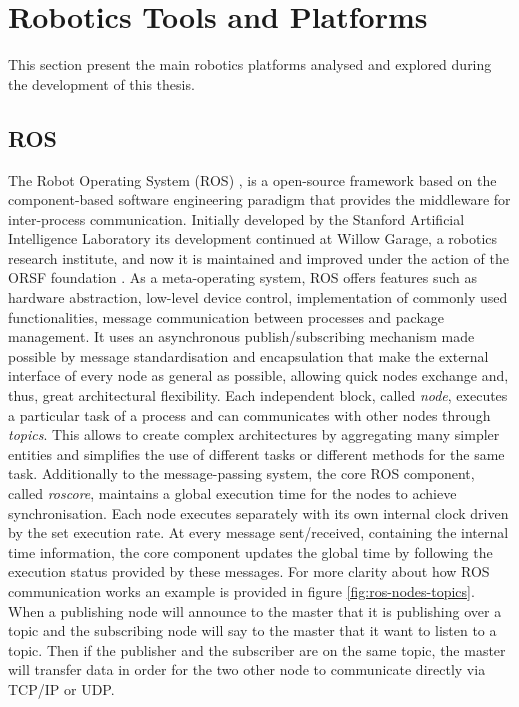 \section{Robotics Tools and Platforms} \label{sec:Robotics-Tools-and-Platforms}
This section present the main robotics platforms analysed and explored during the development of this thesis.

\subsection{ROS}
The Robot Operating System (ROS) \cite{ROS}, is a open-source framework based on the component-based software engineering paradigm that provides the middleware for inter-process communication. Initially developed by the Stanford  Artificial Intelligence Laboratory its development continued at Willow Garage, a robotics research institute, and now it is maintained and improved under the action of the ORSF foundation \cite{ROS}. As a meta-operating system, ROS offers features such as hardware abstraction, low-level device control, implementation of commonly used functionalities, message communication between processes and package management. It uses an asynchronous publish/subscribing mechanism made possible by message standardisation and encapsulation that make the external interface of every node as general as possible, allowing quick nodes exchange and, thus, great architectural flexibility. Each independent block, called \textit{node}, executes a particular task of a process and can communicates with other nodes through \textit{topics}. This allows to create complex architectures by aggregating many simpler entities and simplifies the use of different tasks  or different methods for the same task. Additionally to the message-passing system, the core ROS component, called \textit{roscore}, maintains a global execution time for the nodes to achieve synchronisation. Each node executes separately with its own internal clock driven by the set execution rate. At every message sent/received, containing the internal time information, the core component updates the global time by following the execution status provided by these messages.
For more clarity about how ROS communication works an example is provided in figure \ref{fig:ros-nodes-topics}. When a publishing node will announce to the master that it is publishing over a topic and the subscribing node will say to the master that it want to listen to a topic. Then if the publisher
and the subscriber are on the same topic, the master will transfer data in order for the two other node to communicate directly via TCP/IP or UDP.

